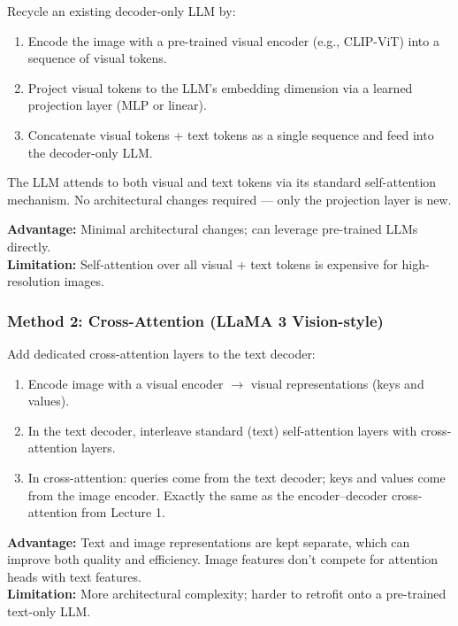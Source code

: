 \documentclass[11pt, a4paper]{article}
\begin{document}
\begin{defbox}
Recycle an existing decoder-only LLM by:
\begin{enumerate}[leftmargin=1.5em]
  \item Encode the image with a pre-trained visual encoder (e.g., CLIP-ViT) into a sequence of visual tokens.
  \item Project visual tokens to the LLM's embedding dimension via a learned projection layer (MLP or linear).
  \item Concatenate visual tokens + text tokens as a single sequence and feed into the decoder-only LLM.
\end{enumerate}
The LLM attends to both visual and text tokens via its standard self-attention mechanism. No architectural changes required --- only the projection layer is new.

\textbf{Advantage:} Minimal architectural changes; can leverage pre-trained LLMs directly.\\
\textbf{Limitation:} Self-attention over all visual + text tokens is expensive for high-resolution images.
\end{defbox}

\subsubsection{Method 2: Cross-Attention (LLaMA 3 Vision-style)}

\begin{defbox}
Add dedicated cross-attention layers to the text decoder:
\begin{enumerate}[leftmargin=1.5em]
  \item Encode image with a visual encoder $\to$ visual representations (keys and values).
  \item In the text decoder, interleave standard (text) self-attention layers with cross-attention layers.
  \item In cross-attention: queries come from the text decoder; keys and values come from the image encoder. Exactly the same as the encoder--decoder cross-attention from Lecture 1.
\end{enumerate}

\textbf{Advantage:} Text and image representations are kept separate, which can improve both quality and efficiency. Image features don't compete for attention heads with text features.\\
\textbf{Limitation:} More architectural complexity; harder to retrofit onto a pre-trained text-only LLM.
\end{defbox}
\end{document}
